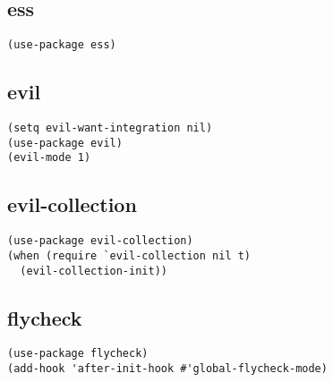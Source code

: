 \documentclass[11pt]{article}
\begin{document}
\subsection{ess}
\label{sec:org2e61154}
\begin{verbatim}
(use-package ess)
\end{verbatim}
\subsection{evil}
\label{sec:org25000c1}
\begin{verbatim}
(setq evil-want-integration nil)
(use-package evil)
(evil-mode 1)
\end{verbatim}
\subsection{evil-collection}
\label{sec:org0ad5c85}
\begin{verbatim}
(use-package evil-collection)
(when (require `evil-collection nil t)
  (evil-collection-init))
\end{verbatim}
\subsection{flycheck}
\label{sec:orgab5ce57}
\begin{verbatim}
(use-package flycheck)
(add-hook 'after-init-hook #'global-flycheck-mode)
\end{verbatim}
\end{document}
